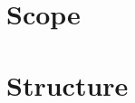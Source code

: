 \documentclass[12pt,a4paper,oneside,pdftex]{report}
\begin{document}
    \section{Scope}
    \label{sec:scopeofthethesis}
    
    \section{Structure}
    \label{sec:structureofthethesis}
    









\end{document}
